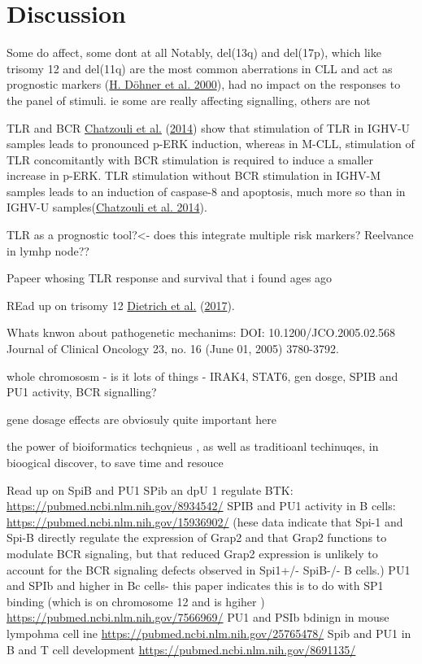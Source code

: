 \documentclass[11pt, a4paper, twosided]{book}
\begin{document}
\hypertarget{discussion}{%
\section{Discussion}\label{discussion}}

Some do affect, some dont at all
Notably, del(13q) and del(17p), which like trisomy 12 and del(11q) are the most common aberrations in CLL and act as prognostic markers (\protect\hyperlink{ref-Dohner2000}{H. Döhner et al. 2000}), had no impact on the responses to the panel of stimuli.
ie some are really affecting signalling, others are not

TLR and BCR
\protect\hyperlink{ref-Chatzouli2014}{Chatzouli et al.} (\protect\hyperlink{ref-Chatzouli2014}{2014}) show that stimulation of TLR in IGHV-U samples leads to pronounced p-ERK induction, whereas in M-CLL, stimulation of TLR concomitantly with BCR stimulation is required to induce a smaller increase in p-ERK. TLR stimulation without BCR stimulation in IGHV-M samples leads to an induction of caspase-8 and apoptosis, much more so than in IGHV-U samples(\protect\hyperlink{ref-Chatzouli2014}{Chatzouli et al. 2014}).

TLR as a prognostic tool?\textless- does this integrate multiple risk markers?
Reelvance in lymhp node??

Papeer whosing TLR response and survival that i found ages ago

REad up on trisomy 12
\protect\hyperlink{ref-JCIpaper}{Dietrich et al.} (\protect\hyperlink{ref-JCIpaper}{2017}).

Whats knwon about pathogenetic mechanims:
DOI: 10.1200/JCO.2005.02.568 Journal of Clinical Oncology 23, no. 16 (June 01, 2005) 3780-3792.

whole chromososm - is it lots of things - IRAK4, STAT6, gen dosge, SPIB and PU1 activity, BCR signalling?

gene dosage effects are obviosuly quite important here

the power of bioiformatics techqnieus , as well as traditioanl techinuqes, in bioogical discover, to save time and resouce

Read up on SpiB and PU1
SPib an dpU 1 regulate BTK: \url{https://pubmed.ncbi.nlm.nih.gov/8934542/}
SPIB and PU1 activity in B cells: \url{https://pubmed.ncbi.nlm.nih.gov/15936902/}
(hese data indicate that Spi-1 and Spi-B directly regulate the expression of Grap2 and that Grap2 functions to modulate BCR signaling, but that reduced Grap2 expression is unlikely to account for the BCR signaling defects observed in Spi1+/- SpiB-/- B cells.)
PU1 and SPIb and higher in Bc cells- this paper indicates this is to do with SP1 binding (which is on chromosome 12 and is hgiher ) \url{https://pubmed.ncbi.nlm.nih.gov/7566969/}
PU1 and PSIb bdinign in mouse lympohma cell ine \url{https://pubmed.ncbi.nlm.nih.gov/25765478/}
Spib and PU1 in B and T cell development \url{https://pubmed.ncbi.nlm.nih.gov/8691135/}
\end{document}
